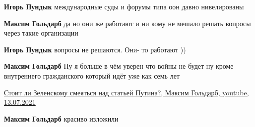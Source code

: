 \begin{itemize}
\begin{itemize}
\textbf{Игорь Пундык} международные суды и форумы типа оон давно нивелированы

 
\textbf{Максим Гольдарб} да но они же работают и ни кому не мешало решать вопросы через такие организации

 
\textbf{Игорь Пундык} вопросы не решаются. Они- то работают ))

 
\textbf{Максим Гольдарб} Ну я больше в чём уверен что войны не будет ну кроме внутреннего гражданского который идёт уже как семь лет
\end{itemize}

 

\href{https://youtu.be/QPLt871aTDE}{%
Стоит ли Зеленскому смеяться над статьей Путина?, Максим Гольдарб, youtube, 13.07.2021%
}

\begin{itemize}
 
\textbf{Максим Гольдарб} красиво изложили

 

\end{itemize}
\end{itemize}
